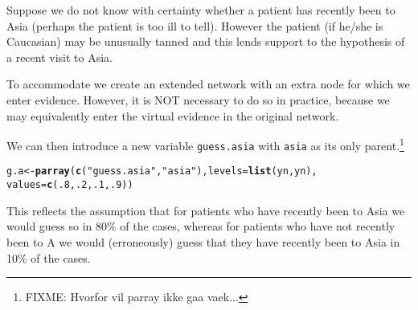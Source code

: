 \documentclass[10pt]{article}\usepackage[]{graphicx}\usepackage[]{color}
\makeatletter
\newcommand{\hlnum}[1]{\textcolor[rgb]{0.686,0.059,0.569}{#1}}%
\newcommand{\hlstr}[1]{\textcolor[rgb]{0.192,0.494,0.8}{#1}}%
\newcommand{\hlstd}[1]{\textcolor[rgb]{0.345,0.345,0.345}{#1}}%
\newcommand{\hlkwb}[1]{\textcolor[rgb]{0.69,0.353,0.396}{#1}}%
\newcommand{\hlkwc}[1]{\textcolor[rgb]{0.333,0.667,0.333}{#1}}%
\newcommand{\hlkwd}[1]{\textcolor[rgb]{0.737,0.353,0.396}{\textbf{#1}}}%
\newenvironment{kframe}{%
 \def\at@end@of@kframe{}%
 \ifinner\ifhmode%
  \def\at@end@of@kframe{\end{minipage}}%
  \begin{minipage}{\columnwidth}%
 \fi\fi%
 \def\FrameCommand##1{\hskip\@totalleftmargin \hskip-\fboxsep
 \colorbox{shadecolor}{##1}\hskip-\fboxsep
     \hskip-\linewidth \hskip-\@totalleftmargin \hskip\columnwidth}%
 \MakeFramed {\advance\hsize-\width
   \@totalleftmargin\z@ \linewidth\hsize
   \@setminipage}}%
 {\par\unskip\endMakeFramed%
 \at@end@of@kframe}
\newenvironment{knitrout}{}{} %
\def\code#1{{\texttt{#1}}}
\makeatother
\begin{document}
Suppose we do not know with certainty whether a patient has
recently been to Asia (perhaps the patient is too ill to
tell). However the patient (if he/she is Caucasian) may be unusually
tanned and this lends support to the hypothesis of a recent visit to
Asia.

To accommodate we create an extended network with an extra
node for which we enter evidence.  However, it is NOT necessary to do
so in practice, because we may equivalently enter the virtual evidence
in the original network.

We can then introduce a new variable
\code{guess.asia} with \code{asia} as its only parent.\footnote{FIXME: Hvorfor vil parray ikke gaa vaek...}

\begin{knitrout}
\color{fgcolor}\begin{kframe}
\begin{alltt}
\hlstd{g.a} \hlkwb{<-} \hlkwd{parray}\hlstd{(}\hlkwd{c}\hlstd{(}\hlstr{"guess.asia"}\hlstd{,} \hlstr{"asia"}\hlstd{),} \hlkwc{levels}\hlstd{=}\hlkwd{list}\hlstd{(yn, yn),}
              \hlkwc{values}\hlstd{=}\hlkwd{c}\hlstd{(}\hlnum{.8}\hlstd{,}\hlnum{.2}\hlstd{,} \hlnum{.1}\hlstd{,}\hlnum{.9}\hlstd{))}
\end{alltt}
\end{kframe}
\end{knitrout}

This reflects the assumption that for patients who have recently been
to Asia we would guess so in 80\% of the cases, whereas for patients who have
not recently been to A we would (erroneously) guess that they have
recently been to Asia in 10\% of the cases.
\end{document}
